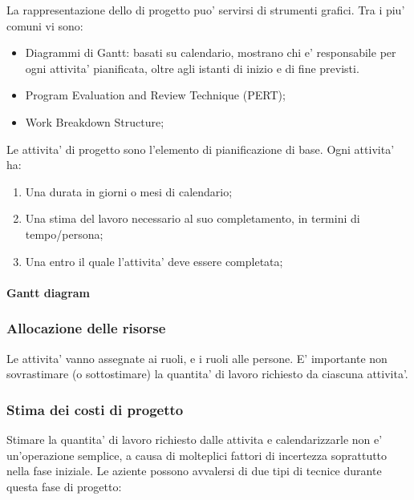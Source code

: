 La rappresentazione dello  di progetto puo' servirsi di strumenti grafici. Tra i piu' comuni vi sono:
\begin{itemize}
	\item Diagrammi di Gantt: basati su calendario, mostrano chi e' responsabile per ogni attivita' pianificata, oltre agli istanti di inizio e di fine previsti.
	\item Program Evaluation and Review Technique (PERT);
	\item Work Breakdown Structure;
\end{itemize}

Le attivita' di progetto sono l'elemento di pianificazione di base. Ogni attivita' ha:
\begin{enumerate}
	\item Una durata in giorni o mesi di calendario;
	\item Una stima del lavoro necessario al suo completamento, in termini di tempo/persona;
	\item Una  entro il quale l'attivita' deve essere completata;
\end{enumerate}

\paragraph{Gantt diagram}


\subsubsection{Allocazione delle risorse}
Le attivita' vanno assegnate ai ruoli, e i ruoli alle persone. E' importante non sovrastimare (o sottostimare) la quantita' di lavoro richiesto da ciascuna attivita'.

\subsubsection{Stima dei costi di progetto}

Stimare la quantita' di lavoro richiesto dalle attivita e calendarizzarle non e' un'operazione semplice, a causa di molteplici fattori di incertezza soprattutto nella fase iniziale. Le aziente possono avvalersi di due tipi di tecnice durante questa fase di progetto:


